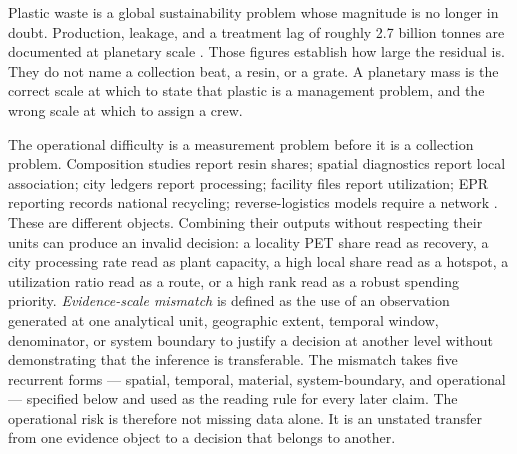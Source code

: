 \documentclass[12pt,a4paper]{article}
\begin{document}
Plastic waste is a global sustainability problem whose magnitude is no longer in doubt. Production, leakage, and a treatment lag of roughly 2.7 billion tonnes are documented at planetary scale \citep{geyer_plastic_2017,jambeck_plastic_2015,worldbank_whatawaste2_2018,worldbank_whatawaste3_2025}. Those figures establish how large the residual is. They do not name a collection beat, a resin, or a grate. A planetary mass is the correct scale at which to state that plastic is a management problem, and the wrong scale at which to assign a crew.

The operational difficulty is a measurement problem before it is a collection problem. Composition studies report resin shares; spatial diagnostics report local association; city ledgers report processing; facility files report utilization; EPR reporting records national recycling; reverse-logistics models require a network \citep{cpcb_60cities_2015,anselin_lisa_1995,delhi_eco_survey_2026,dpcc_mpr_2025,cpcb_pwm_amendment_2022,govindan_rl_2015}. These are different objects. Combining their outputs without respecting their units can produce an invalid decision: a locality PET share read as recovery, a city processing rate read as plant capacity, a high local share read as a hotspot, a utilization ratio read as a route, or a high rank read as a robust spending priority. \emph{Evidence-scale mismatch} is defined as the use of an observation generated at one analytical unit, geographic extent, temporal window, denominator, or system boundary to justify a decision at another level without demonstrating that the inference is transferable. The mismatch takes five recurrent forms --- spatial, temporal, material, system-boundary, and operational --- specified below and used as the reading rule for every later claim. The operational risk is therefore not missing data alone. It is an unstated transfer from one evidence object to a decision that belongs to another.
\end{document}
